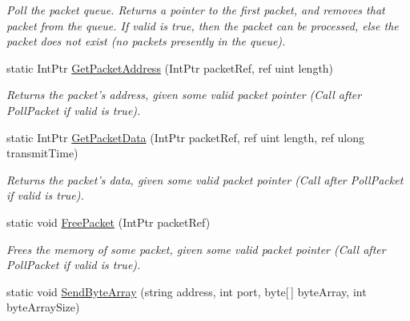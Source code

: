 \begin{DoxyCompactItemize}
\begin{DoxyCompactList}\small\item\em Poll the packet queue. Returns a pointer to the first packet, and removes that packet from the queue. If valid is true, then the packet can be processed, else the packet does not exist (no packets presently in the queue). \end{DoxyCompactList}\item 
\hypertarget{class_champ_net_plugin_1_1_network_a582632ef24eedc5973791aaedc4fcd7d}{static Int\-Ptr \hyperlink{class_champ_net_plugin_1_1_network_a582632ef24eedc5973791aaedc4fcd7d}{Get\-Packet\-Address} (Int\-Ptr packet\-Ref, ref uint length)}\label{class_champ_net_plugin_1_1_network_a582632ef24eedc5973791aaedc4fcd7d}

\begin{DoxyCompactList}\small\item\em Returns the packet's address, given some valid packet pointer (Call after Poll\-Packet if valid is true). \end{DoxyCompactList}\item 
\hypertarget{class_champ_net_plugin_1_1_network_af6c381600f60a77db7c24d327c7c2c52}{static Int\-Ptr \hyperlink{class_champ_net_plugin_1_1_network_af6c381600f60a77db7c24d327c7c2c52}{Get\-Packet\-Data} (Int\-Ptr packet\-Ref, ref uint length, ref ulong transmit\-Time)}\label{class_champ_net_plugin_1_1_network_af6c381600f60a77db7c24d327c7c2c52}

\begin{DoxyCompactList}\small\item\em Returns the packet's data, given some valid packet pointer (Call after Poll\-Packet if valid is true). \end{DoxyCompactList}\item 
\hypertarget{class_champ_net_plugin_1_1_network_a230482602fa8f253b8d1f3d0a11780d3}{static void \hyperlink{class_champ_net_plugin_1_1_network_a230482602fa8f253b8d1f3d0a11780d3}{Free\-Packet} (Int\-Ptr packet\-Ref)}\label{class_champ_net_plugin_1_1_network_a230482602fa8f253b8d1f3d0a11780d3}

\begin{DoxyCompactList}\small\item\em Frees the memory of some packet, given some valid packet pointer (Call after Poll\-Packet if valid is true). \end{DoxyCompactList}\item 
\hypertarget{class_champ_net_plugin_1_1_network_a018ec78857afa38d5f64607e63201abd}{static void \hyperlink{class_champ_net_plugin_1_1_network_a018ec78857afa38d5f64607e63201abd}{Send\-Byte\-Array} (string address, int port, byte\mbox{[}$\,$\mbox{]} byte\-Array, int byte\-Array\-Size)}\label{class_champ_net_plugin_1_1_network_a018ec78857afa38d5f64607e63201abd}


\end{DoxyCompactItemize}
